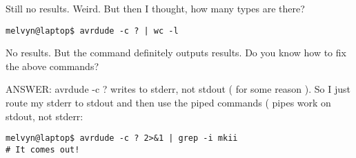 \documentclass[10pt]{article}
\begin{document}
Still no results. Weird. But then I thought, how many types are there?

\begin{lstlisting}[style=term]
melvyn@laptop$ avrdude -c ? | wc -l
\end{lstlisting}

No results. But the command definitely outputs results. Do you know how to fix
the above commands?

ANSWER: avrdude -c ?  writes to stderr, not stdout ( for some reason ). So I
just route my stderr to stdout and then use the piped commands ( pipes work on
stdout, not stderr:

\begin{lstlisting}[style=term]
melvyn@laptop$ avrdude -c ? 2>&1 | grep -i mkii
# It comes out!
\end{lstlisting}
\end{document}

